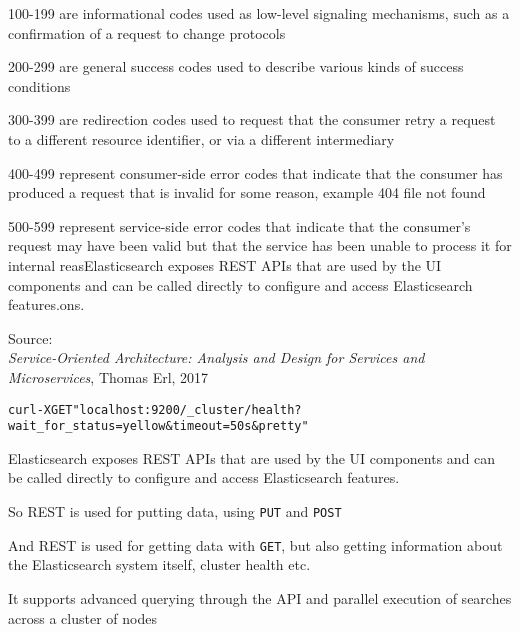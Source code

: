 \documentclass[Screen16to9,17pt]{foils}
\begin{document}
\begin{list2}
\item 100-199 are informational codes used as low-level signaling mechanisms, such as a confirmation of a request to change protocols
\item 200-299 are general success codes used to describe various kinds of success conditions
\item 300-399 are redirection codes used to request that the consumer retry a request to a different resource identifier, or via a different intermediary
\item 400-499 represent consumer-side error codes that indicate that the consumer has produced a request that is invalid for some reason, example 404 file not found
\item 500-599 represent service-side error codes that indicate that the consumer’s request may have been valid but that the service has been unable to process it for internal reasElasticsearch exposes REST APIs that are used by the UI components and can be called directly to configure and access Elasticsearch features.ons.
\end{list2}
Source: {\footnotesize\\
\emph{Service‑Oriented Architecture: Analysis and Design for Services and Microservices}, Thomas Erl, 2017}








\begin{alltt}
curl -X GET "localhost:9200/_cluster/health?wait_for_status=yellow&timeout=50s&pretty"
\end{alltt}

\begin{list2}
\item Elasticsearch exposes REST APIs that are used by the UI components and can be called directly to configure and access Elasticsearch features.
\item {}
\item So REST is used for putting data, using \verb+PUT+ and \verb+POST+
\item And REST is used for getting data with \verb+GET+, but also getting information about the Elasticsearch system itself, cluster health etc.
\item It supports advanced querying through the API and parallel execution of searches across a cluster of nodes
\end{list2}
\end{document}
